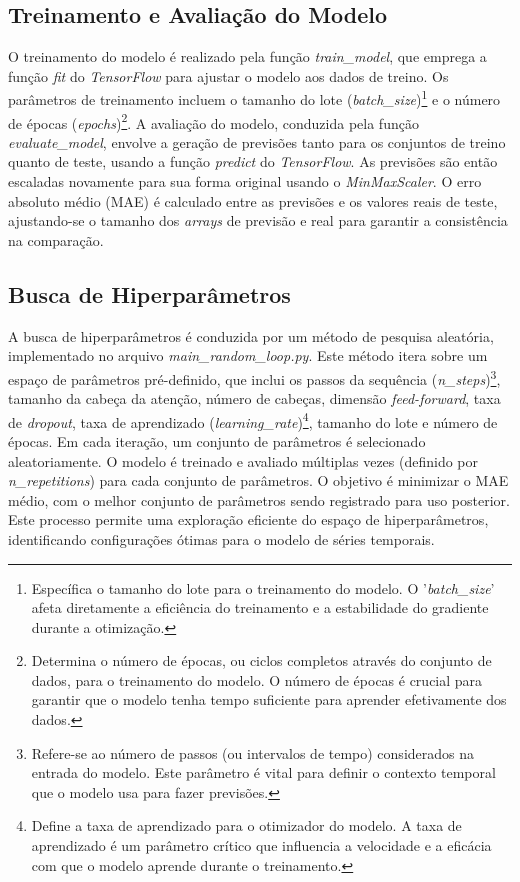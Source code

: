 \subsection{Treinamento e Avaliação do Modelo}
O treinamento do modelo é realizado pela função \textit{train\_model}, que emprega a função \textit{fit} do \textit{TensorFlow} para ajustar o modelo aos dados de treino. Os parâmetros de treinamento incluem o tamanho do lote (\textit{batch\_size})\footnote{Específica o tamanho do lote para o treinamento do modelo. O '\textit{batch\_size}' afeta diretamente a eficiência do treinamento e a estabilidade do gradiente durante a otimização.} e o número de épocas (\textit{epochs})\footnote{Determina o número de épocas, ou ciclos completos através do conjunto de dados, para o treinamento do modelo. O número de épocas é crucial para garantir que o modelo tenha tempo suficiente para aprender efetivamente dos dados.}. A avaliação do modelo, conduzida pela função \textit{evaluate\_model}, envolve a geração de previsões tanto para os conjuntos de treino quanto de teste, usando a função \textit{predict} do \textit{TensorFlow}. As previsões são então escaladas novamente para sua forma original usando o \textit{MinMaxScaler}. O erro absoluto médio (MAE) é calculado entre as previsões e os valores reais de teste, ajustando-se o tamanho dos \textit{arrays} de previsão e real para garantir a consistência na comparação.

\subsection{Busca de Hiperparâmetros}
A busca de hiperparâmetros é conduzida por um método de pesquisa aleatória, implementado no arquivo \textit{main\_random\_loop.py}. Este método itera sobre um espaço de parâmetros pré-definido, que inclui os passos da sequência (\textit{n\_steps})\footnote{Refere-se ao número de passos (ou intervalos de tempo) considerados na entrada do modelo. Este parâmetro é vital para definir o contexto temporal que o modelo usa para fazer previsões.}, tamanho da cabeça da atenção, número de cabeças, dimensão \textit{feed-forward}, taxa de \textit{dropout}, taxa de aprendizado (\textit{learning\_rate})\footnote{Define a taxa de aprendizado para o otimizador do modelo. A taxa de aprendizado é um parâmetro crítico que influencia a velocidade e a eficácia com que o modelo aprende durante o treinamento.}, tamanho do lote e número de épocas. Em cada iteração, um conjunto de parâmetros é selecionado aleatoriamente. O modelo é treinado e avaliado múltiplas vezes (definido por \textit{n\_repetitions}) para cada conjunto de parâmetros. O objetivo é minimizar o MAE médio, com o melhor conjunto de parâmetros sendo registrado para uso posterior. Este processo permite uma exploração eficiente do espaço de hiperparâmetros, identificando configurações ótimas para o modelo de séries temporais.

